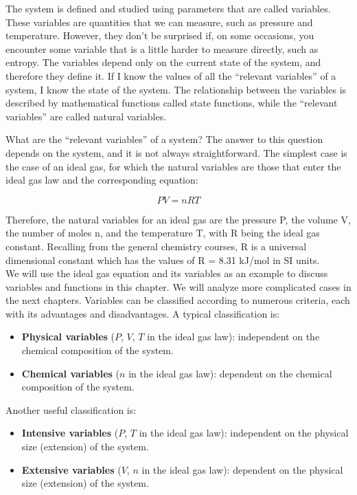 \documentclass[
]{book}
\providecommand{\tightlist}{%
  \setlength{\itemsep}{0pt}\setlength{\parskip}{0pt}}
\theoremstyle{definition}
\theoremstyle{definition}
\theoremstyle{definition}
\theoremstyle{remark}
\begin{document}
The system is defined and studied using parameters that are called variables. These variables are quantities that we can measure, such as pressure and temperature. However, they don't be surprised if, on some occasions, you encounter some variable that is a little harder to measure directly, such as entropy. The variables depend only on the current state of the system, and therefore they define it. If I know the values of all the ``relevant variables'' of a system, I know the state of the system. The relationship between the variables is described by mathematical functions called state functions, while the ``relevant variables'' are called natural variables.

What are the ``relevant variables'' of a system? The answer to this question depends on the system, and it is not always straightforward. The simplest case is the case of an ideal gas, for which the natural variables are those that enter the ideal gas law and the corresponding equation:

\begin{equation}
  PV=nRT       
  \label{eq:idealgaslaworiginal}
\end{equation}

Therefore, the natural variables for an ideal gas are the pressure P, the volume V, the number of moles n, and the temperature T, with R being the ideal gas constant. Recalling from the general chemistry courses, R is a universal dimensional constant which has the values of R = 8.31 kJ/mol in SI units.\\
We will use the ideal gas equation and its variables as an example to discuss variables and functions in this chapter. We will analyze more complicated cases in the next chapters.
Variables can be classified according to numerous criteria, each with its advantages and disadvantages. A typical classification is:

\begin{itemize}
\tightlist
\item
  \textbf{Physical variables} (\(P\), \(V\), \(T\) in the ideal gas law): independent on the chemical composition of the system.
\item
  \textbf{Chemical variables} (\(n\) in the ideal gas law): dependent on the chemical composition of the system.
\end{itemize}

Another useful classification is:

\begin{itemize}
\tightlist
\item
  \textbf{Intensive variables} (\(P\), \(T\) in the ideal gas law): independent on the physical size (extension) of the system.
\item
  \textbf{Extensive variables} (\(V\), \(n\) in the ideal gas law): dependent on the physical size (extension) of the system.
\end{itemize}
\end{document}
